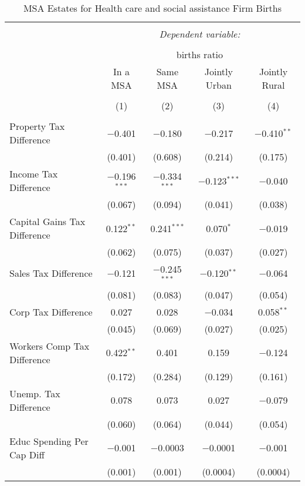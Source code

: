 
\begin{table}[!htbp] \centering 
  \caption{MSA Estates for  Health care and social assistance Firm Births} 
  \label{} 
\begin{tabular}{@{\extracolsep{5pt}}lcccc} 
\\[-1.8ex]\hline 
\hline \\[-1.8ex] 
 & \multicolumn{4}{c}{\textit{Dependent variable:}} \\ 
\cline{2-5} 
\\[-1.8ex] & \multicolumn{4}{c}{births ratio} \\ 
 & In a MSA & Same MSA & Jointly Urban & Jointly Rural \\ 
\\[-1.8ex] & (1) & (2) & (3) & (4)\\ 
\hline \\[-1.8ex] 
 Property Tax Difference & $-$0.401 & $-$0.180 & $-$0.217 & $-$0.410$^{**}$ \\ 
  & (0.401) & (0.608) & (0.214) & (0.175) \\ 
  Income Tax Difference & $-$0.196$^{***}$ & $-$0.334$^{***}$ & $-$0.123$^{***}$ & $-$0.040 \\ 
  & (0.067) & (0.094) & (0.041) & (0.038) \\ 
  Capital Gains Tax Difference & 0.122$^{**}$ & 0.241$^{***}$ & 0.070$^{*}$ & $-$0.019 \\ 
  & (0.062) & (0.075) & (0.037) & (0.027) \\ 
  Sales Tax Difference & $-$0.121 & $-$0.245$^{***}$ & $-$0.120$^{**}$ & $-$0.064 \\ 
  & (0.081) & (0.083) & (0.047) & (0.054) \\ 
  Corp Tax Difference & 0.027 & 0.028 & $-$0.034 & 0.058$^{**}$ \\ 
  & (0.045) & (0.069) & (0.027) & (0.025) \\ 
  Workers Comp Tax Difference & 0.422$^{**}$ & 0.401 & 0.159 & $-$0.124 \\ 
  & (0.172) & (0.284) & (0.129) & (0.161) \\ 
  Unemp. Tax Difference & 0.078 & 0.073 & 0.027 & $-$0.079 \\ 
  & (0.060) & (0.064) & (0.044) & (0.054) \\ 
  Educ Spending Per Cap Diff & $-$0.001 & $-$0.0003 & $-$0.0001 & $-$0.001 \\ 
  & (0.001) & (0.001) & (0.0004) & (0.0004) \\ 

\end{tabular}
\end{table}
